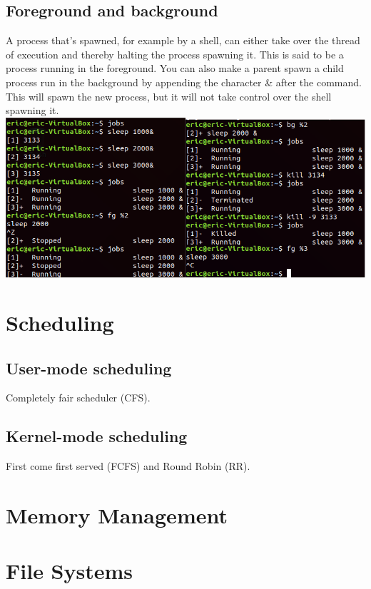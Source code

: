 \documentclass[12pt]{article}
\begin{document}
\subsection{Foreground and background}
A process that's spawned, for example by a shell, can either take over the thread of execution and thereby halting the process spawning it.
This is said to be a process running in the foreground. You can also make a parent spawn a child process run in the background by appending the character \& after the command.
This will spawn the new process, but it will not take control over the shell spawning it.
\includegraphics[scale=0.7]{imgs/fgbg.png}\\

\section{Scheduling}
\subsection{User-mode scheduling}
Completely fair scheduler (CFS).

\subsection{Kernel-mode scheduling}
First come first served  (FCFS) and Round Robin (RR).

\section{Memory Management}

\section{File Systems}
\end{document}
